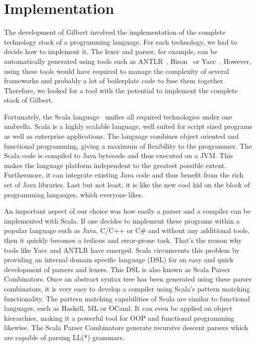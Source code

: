 \chapter{Implementation}
\label{cha:implementation}


The development of Gilbert involved the implementation of the complete technology stack of a programming language.
For each technology, we had to decide how to implement it.
The lexer and parser, for example, can be automatically generated using tools such as ANTLR~\cite{antlr}, Bison~\cite{bison} or Yacc~\cite{yacc}.
However, using these tools would have required to manage the complexity of several frameworks and probably a lot of boilerplate code to fuse them together.
Therefore, we looked for a tool with the potential to implement the complete stack of Gilbert.

Fortunately, the Scala language~\cite{scala,odersky:2010a} unifies all required technologies under one umbrella.
Scala is a highly scalable language, well suited for script sized programs as well as enterprise applications.
The language combines object oriented and functional programming, giving a maximum of flexibility to the programmer.
The Scala code is compiled to Java bytecode and thus executed on a JVM.
This makes the language platform independent to the greatest possible extent.
Furthermore, it can integrate existing Java code and thus benefit from the rich set of Java libraries.
Last but not least, it is like the new cool kid on the block of programming languages, which everyone likes.

An important aspect of our choice was how easily a parser and a compiler can be implemented with Scala.
If one decides to implement these programs within a popular language such as Java, C/C++ or C\# and without any additional tools, then it quickly becomes a tedious and error-prone task.
That's the reason why tools like Yacc and ANTLR have emerged.
Scala circumvents this problem by providing an internal domain specific language (DSL) for an easy and quick development of parsers and lexers.
This DSL is also known as Scala Parser Combinators.
Once an abstract syntax tree has been generated using these parser combinators, it is very easy to develop a compiler using Scala's pattern matching functionality.
The pattern matching capabilities of Scala are similar to functional languages, such as Haskell, ML or OCaml.
It can even be applied on object hierarchies, making it a powerful tool for OOP and functional programming likewise.
The Scala Parser Combinators generate recursive descent parsers which are capable of parsing LL(*) grammars.

